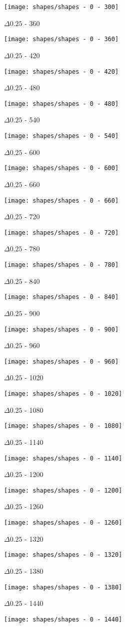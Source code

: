 \begin{enumerate}
\begin{multicols}{3}
\begin{center}
    \texttt{[image: shapes/shapes - 0 - 300]}

    $\Delta 0.25$ - 360

    \texttt{[image: shapes/shapes - 0 - 360]}

    $\Delta 0.25$ - 420

    \texttt{[image: shapes/shapes - 0 - 420]}

    $\Delta 0.25$ - 480

    \texttt{[image: shapes/shapes - 0 - 480]}

    $\Delta 0.25$ - 540

    \texttt{[image: shapes/shapes - 0 - 540]}

    $\Delta 0.25$ - 600

    \texttt{[image: shapes/shapes - 0 - 600]}

    $\Delta 0.25$ - 660

    \texttt{[image: shapes/shapes - 0 - 660]}

    $\Delta 0.25$ - 720

    \texttt{[image: shapes/shapes - 0 - 720]}

    $\Delta 0.25$ - 780

    \texttt{[image: shapes/shapes - 0 - 780]}

    $\Delta 0.25$ - 840

    \texttt{[image: shapes/shapes - 0 - 840]}

    $\Delta 0.25$ - 900

    \texttt{[image: shapes/shapes - 0 - 900]}

    $\Delta 0.25$ - 960

    \texttt{[image: shapes/shapes - 0 - 960]}

    $\Delta 0.25$ - 1020

    \texttt{[image: shapes/shapes - 0 - 1020]}

    $\Delta 0.25$ - 1080

    \texttt{[image: shapes/shapes - 0 - 1080]}

    $\Delta 0.25$ - 1140

    \texttt{[image: shapes/shapes - 0 - 1140]}

    $\Delta 0.25$ - 1200

    \texttt{[image: shapes/shapes - 0 - 1200]}

    $\Delta 0.25$ - 1260

    \texttt{[image: shapes/shapes - 0 - 1260]}

    $\Delta 0.25$ - 1320

    \texttt{[image: shapes/shapes - 0 - 1320]}

    $\Delta 0.25$ - 1380

    \texttt{[image: shapes/shapes - 0 - 1380]}

    $\Delta 0.25$ - 1440

    \texttt{[image: shapes/shapes - 0 - 1440]}
  \end{center}
  \end{multicols}
\end{enumerate}
